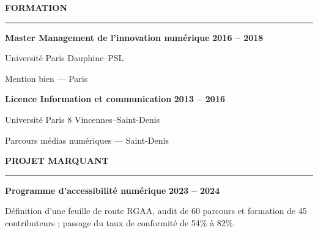 \documentclass[10pt,a4paper]{article}
\newcommand{\mainsection}[1]{%
  \vspace{5.5pt}%
  {\large\bfseries\color{navy}\MakeUppercase{#1}}\par
  \vspace{1.5pt}%
  {\color{blue}\rule{\linewidth}{1.15pt}}\par
  \vspace{4pt}%
}
\newcommand{\education}[4]{%
  \textbf{\color{ink}#1}\hfill
  {\footnotesize\bfseries\color{muted}#2}\par
  {\small\color{blue}#3}\par
  {\footnotesize\color{muted}#4}\par
}
\begin{document}
\begin{minipage}[t]{0.66\textwidth}
  \mainsection{Formation}

  \education{Master Management de l'innovation numérique}{2016 -- 2018}
    {Université Paris Dauphine--PSL}{Mention bien --- Paris}
  \vspace{4pt}
  \education{Licence Information et communication}{2013 -- 2016}
    {Université Paris 8 Vincennes--Saint-Denis}{Parcours médias numériques --- Saint-Denis}

  \mainsection{Projet marquant}
  \textbf{Programme d'accessibilité numérique}\hfill
  {\footnotesize\bfseries\color{muted}2023 -- 2024}\par
  {\small Définition d'une feuille de route RGAA, audit de 60 parcours et
  formation de 45 contributeurs ; passage du taux de conformité de 54\% à 82\%.}

\end{minipage}
\end{document}
